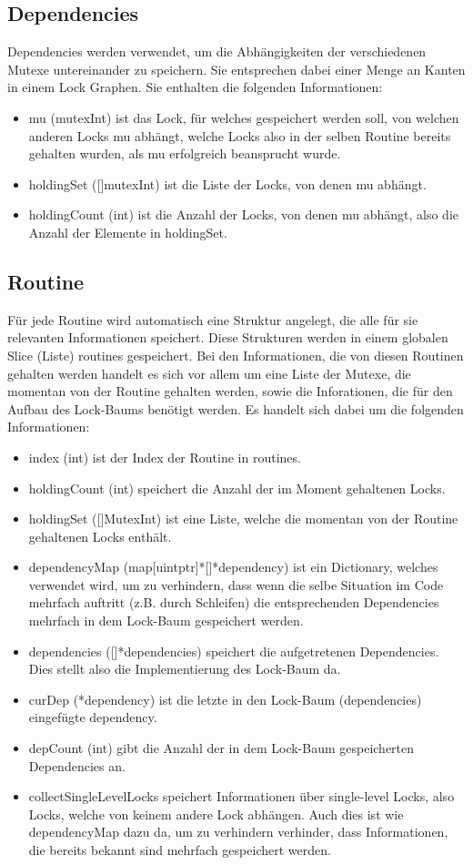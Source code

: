 \subsection{Dependencies}
Dependencies werden verwendet, um die Abhängigkeiten der verschiedenen Mutexe 
untereinander zu speichern. Sie entsprechen dabei einer Menge an Kanten in einem 
Lock Graphen. Sie enthalten die folgenden Informationen:
\begin{itemize}
  \item mu (mutexInt) ist das Lock, für welches gespeichert werden soll, von 
   welchen anderen Locks mu abhängt, welche Locks also in der selben Routine 
   bereits gehalten wurden, als mu erfolgreich beansprucht wurde.
  \item holdingSet ([]mutexInt) ist die Liste der Locks, von denen mu abhängt.
  \item holdingCount (int) ist die Anzahl der Locks, von denen mu abhängt,
   also die Anzahl der Elemente in holdingSet.
\end{itemize}
\subsection{Routine}
Für jede Routine wird automatisch eine Struktur angelegt, die alle für sie 
relevanten Informationen speichert. Diese Strukturen werden in einem 
globalen Slice (Liste) routines gespeichert. Bei den Informationen, die von 
diesen Routinen gehalten werden handelt es 
sich vor allem um eine Liste der Mutexe, die momentan von der Routine 
gehalten werden, sowie die Inforationen, die für den Aufbau des Lock-Baums 
benötigt werden. Es handelt sich dabei um die folgenden Informationen:
\begin{itemize}
  \item index (int) ist der Index der Routine in routines.
  \item holdingCount (int) speichert die Anzahl der im Moment gehaltenen Locks.
  \item holdingSet ([]MutexInt) ist eine Liste, welche die
    momentan von der Routine gehaltenen Locks enthält.
  \item dependencyMap (map[uintptr]*[]*dependency) ist ein Dictionary, welches 
   verwendet wird, um zu verhindern, dass wenn die selbe Situation im Code 
   mehrfach auftritt (z.B. durch Schleifen) die entsprechenden Dependencies 
   mehrfach in dem Lock-Baum gespeichert werden.
  \item dependencies ([]*dependencies) speichert die aufgetretenen Dependencies.
   Dies stellt also die Implementierung des Lock-Baum da.
  \item curDep (*dependency) ist die letzte in den Lock-Baum (dependencies)
   eingefügte dependency.
  \item depCount (int) gibt die Anzahl der in dem Lock-Baum gespeicherten 
   Dependencies an.
  \item collectSingleLevelLocks speichert Informationen über single-level Locks, 
   also Locks, welche von keinem andere Lock abhängen. Auch dies ist wie 
   dependencyMap dazu da, um zu verhindern verhinder, dass Informationen, die
   bereits bekannt sind mehrfach gespeichert werden. 
\end{itemize}
